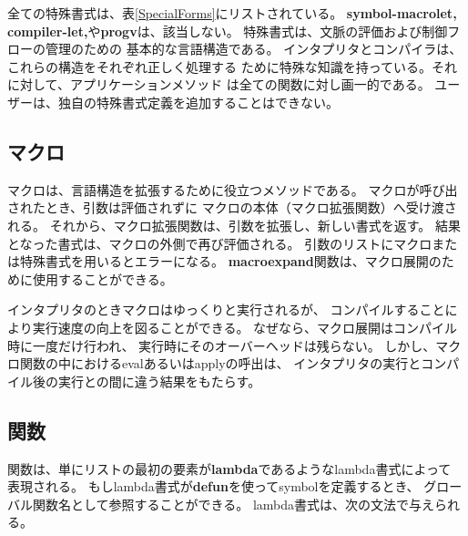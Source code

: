 全ての特殊書式は、表\ref{SpecialForms}にリストされている。
{\bf symbol-macrolet, compiler-let,}や{\bf progv}は、該当しない。
特殊書式は、文脈の評価および制御フローの管理のための
基本的な言語構造である。
インタプリタとコンパイラは、これらの構造をそれぞれ正しく処理する
ために特殊な知識を持っている。それに対して、アプリケーションメソッド
は全ての関数に対し画一的である。
ユーザーは、独自の特殊書式定義を追加することはできない。

\subsection{マクロ}

マクロは、言語構造を拡張するために役立つメソッドである。
マクロが呼び出されたとき、引数は評価されずに
マクロの本体（マクロ拡張関数）へ受け渡される。
それから、マクロ拡張関数は、引数を拡張し、新しい書式を返す。
結果となった書式は、マクロの外側で再び評価される。
引数のリストにマクロまたは特殊書式を用いるとエラーになる。
{\bf macroexpand}関数は、マクロ展開のために使用することができる。

インタプリタのときマクロはゆっくりと実行されるが、
コンパイルすることにより実行速度の向上を図ることができる。
なぜなら、マクロ展開はコンパイル時に一度だけ行われ、
実行時にそのオーバーヘッドは残らない。
しかし、マクロ関数の中におけるevalあるいはapplyの呼出は、
インタプリタの実行とコンパイル後の実行との間に違う結果をもたらす。

\subsection{関数}

関数は、単にリストの最初の要素が{\bf lambda}であるようなlambda書式によって
表現される。
もしlambda書式が{\bf defun}を使ってsymbolを定義するとき、
グローバル関数名として参照することができる。
lambda書式は、次の文法で与えられる。


